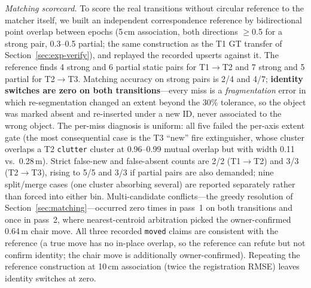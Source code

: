 \documentclass[electronics,article,accept,pdftex,moreauthors]{Definitions/mdpi}
\begin{document}
\emph{Matching scorecard.} To score the real transitions without circular
reference to the matcher itself, we built an independent correspondence
reference by bidirectional point overlap between epochs (5\,cm
association, both directions $\ge$0.5 for a strong pair, 0.3--0.5
partial; the same construction as the T1 GT transfer of
Section~\ref{sec:exp-verify}), and replayed the recorded upserts against it.
The reference finds 4 strong and 6 partial static pairs for
T1$\rightarrow$T2 and 7 strong and 5 partial for T2$\rightarrow$T3.
Matching accuracy on strong pairs is 2/4 and 4/7; \textbf{{identity
switches are zero on both transitions}}---every miss is a
\emph{fragmentation} error in which re-segmentation changed an extent
beyond the 30\% tolerance, so the object was marked absent and
re-inserted under a new ID, never associated to the wrong object. The
per-miss diagnosis is uniform: all five failed the per-axis extent gate
(the most consequential case is the T3 ``new'' fire extinguisher, whose
cluster overlaps a T2 \texttt{clutter} cluster at 0.96--0.99 mutual
overlap but with width 0.11 vs.\ 0.28\,m). Strict false-new and
false-absent counts are 2/2 (T1$\rightarrow$T2) and 3/3
(T2$\rightarrow$T3), rising to 5/5 and 3/3 if partial pairs are also
demanded; nine split/merge cases (one cluster absorbing several) are
reported separately rather than forced into either bin. Multi-candidate
conflicts---the greedy resolution of Section~\ref{sec:matching}---occurred
zero times in pass~1 on both transitions and once in pass~2, where
nearest-centroid arbitration picked the owner-confirmed 0.64\,m chair
move. All three recorded \texttt{moved} claims are consistent with the
reference (a true move has no in-place overlap, so the reference can
refute but not confirm identity; the chair move is additionally
owner-confirmed). Repeating the reference construction at 10\,cm
association (twice the registration RMSE) leaves identity switches at
zero.
\end{document}

